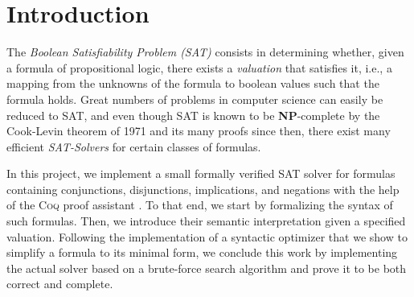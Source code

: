 \section{Introduction}\label{sec:intro}

The \emph{Boolean Satisfiability Problem (SAT)} consists in determining whether, given a formula of propositional logic, there exists a \emph{valuation} that satisfies it, i.e., a mapping from the unknowns of the formula to boolean values such that the formula holds. 
Great numbers of problems in computer science can easily be reduced to SAT, and even though SAT is known to be \textbf{NP}-complete by the Cook-Levin theorem of 1971 \cite{cook1971} and its many proofs since then, there exist many efficient \emph{SAT-Solvers} for certain classes of formulas.

\bigbreak

In this project, we implement a small formally verified SAT solver for formulas containing conjunctions, disjunctions, implications, and negations with the help of the \textsc{Coq} proof assistant \cite{coq_ref_man}. 
To that end, we start by formalizing the syntax of such formulas. 
Then, we introduce their semantic interpretation given a specified valuation. 
Following the implementation of a syntactic optimizer that we show to simplify a formula to its minimal form, we conclude this work by implementing the actual solver based on a brute-force search algorithm and prove it to be both correct and complete.
